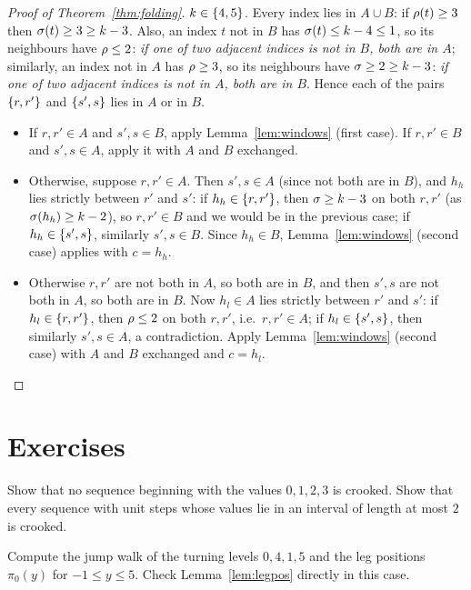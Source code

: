 \begin{proof}[Proof of Theorem~\ref{thm:folding}]
\emph{$k\in\left\{ 4,5 \right\}$.} Every index lies in $A\cup B$: if $\rho(t)\ge3$ then $\sigma(t)\ge3\ge k-3$. Also, an index $t$ not in $B$ has
$\sigma(t)\le k-4\le1$, so its neighbours have $\rho\le2$: \emph{if one of two adjacent indices is not in $B$, both are in $A$}; similarly, an
index not in $A$ has $\rho\ge3$, so its neighbours have $\sigma\ge2\ge k-3$: \emph{if one of two adjacent indices is not in $A$, both are in
$B$}. Hence each of the pairs $\left\{ r,r' \right\}$ and $\left\{ s',s \right\}$ lies in $A$ or in $B$.
\begin{itemize}
\item If $r,r'\in A$ and $s',s\in B$, apply Lemma~\ref{lem:windows} (first case). If $r,r'\in B$ and $s',s\in A$, apply it with $A$ and $B$
exchanged.
\item Otherwise, suppose $r,r'\in A$. Then $s',s\in A$ (since not both are in $B$), and $h_h$ lies strictly between $r'$ and $s'$: if
$h_h\in\left\{ r,r' \right\}$, then $\sigma\ge k-3$ on both $r,r'$ (as $\sigma(h_h)\ge k-2$), so $r,r'\in B$ and we would be in the previous case; if
$h_h\in\left\{ s',s \right\}$, similarly $s',s\in B$. Since $h_h\in B$, Lemma~\ref{lem:windows} (second case) applies with $c=h_h$.
\item Otherwise $r,r'$ are not both in $A$, so both are in $B$, and then $s',s$ are not both in $A$, so both are in $B$. Now $h_l\in A$
lies strictly between $r'$ and $s'$: if $h_l\in\left\{ r,r' \right\}$, then $\rho\le2$ on both $r,r'$, i.e.\ $r,r'\in A$; if $h_l\in\left\{ s',s \right\}$, then
similarly $s',s\in A$, a contradiction. Apply Lemma~\ref{lem:windows} (second case) with $A$ and $B$ exchanged and $c=h_l$.\qedhere
\end{itemize}
\end{proof}



\section*{Exercises}

\begin{exercise}
Show that no sequence beginning with the values $0,1,2,3$ is crooked. Show that every sequence with unit steps whose values lie in an
interval of length at most $2$ is crooked.
\end{exercise}

\begin{exercise}
Compute the jump walk of the turning levels $0,4,1,5$ and the leg positions $\pi_0(y)$ for $-1\le y\le5$. Check
Lemma~\ref{lem:legpos} directly in this case.
\end{exercise}

